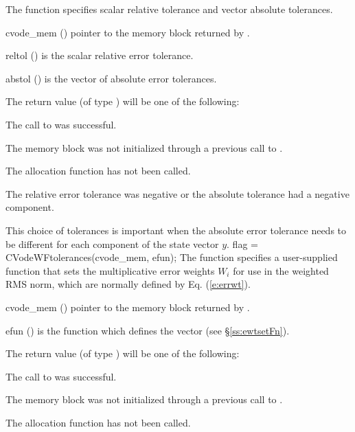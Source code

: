 {
  The function  specifies scalar relative tolerance and
  vector absolute tolerances.
}
{
  \begin{args}
  \item[cvode\_mem] ()
    pointer to the {\cvodes} memory block returned by .
  \item[reltol] ()
    is the scalar relative error tolerance.
  \item[abstol] ()
    is the vector of absolute error tolerances.
  \end{args}
}
{
  The return value  (of type ) will be one of the following:
  \begin{args}
  \item[\Id{CV\_SUCCESS}]
    The call to  was successful.
  \item[\Id{CV\_MEM\_NULL}]
    The {\cvodes} memory block was not initialized through a previous call to
    .
  \item[\Id{CV\_NO\_MALLOC}]
    The allocation function  has not been called.
  \item[\Id{CV\_ILL\_INPUT}]
    The relative error tolerance was negative or the absolute tolerance
    had a negative component.
  \end{args}
}
{
  This choice of tolerances is important when the absolute error tolerance needs to
  be different for each component of the state vector $y$.
}
{
  flag = CVodeWFtolerances(cvode\_mem, efun);
}
{
  The function  specifies a user-supplied function 
  that sets the multiplicative error weights $W_i$ for use in the weighted
  RMS norm, which are normally defined by Eq. (\ref{e:errwt}).
}
{
  \begin{args}
  \item[cvode\_mem] ()
    pointer to the {\cvodes} memory block returned by .
  \item[efun] ()
    is the {\CC} function which defines the  vector (see
    \S\ref{ss:ewtsetFn}).
  \end{args}
}
{
  The return value  (of type ) will be one of the following:
  \begin{args}
  \item[\Id{CV\_SUCCESS}]
    The call to  was successful.
  \item[\Id{CV\_MEM\_NULL}]
    The {\cvodes} memory block was not initialized through a previous call to
    .
  \item[\Id{CV\_NO\_MALLOC}]
    The allocation function  has not been called.
  \end{args}
}
{}

